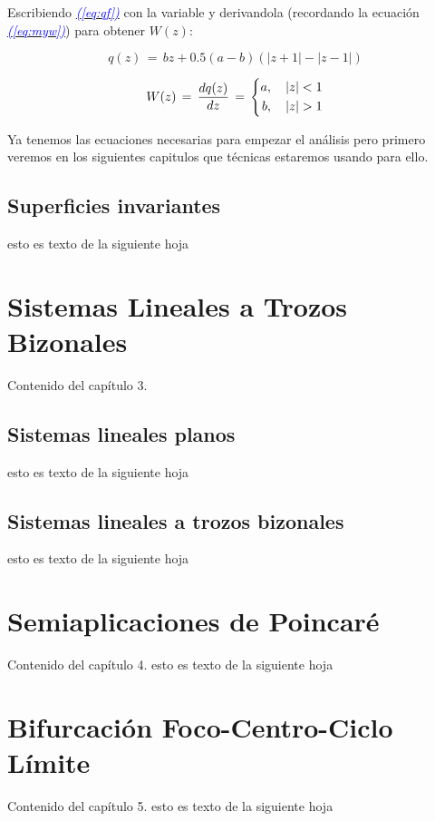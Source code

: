 \documentclass[12pt,a4paper]{report} %
\newcommand{\eref}[1]{\hyperref[#1]{\textcolor{blue}{\textit{(\ref*{#1})}}}}
\begin{document}
    Escribiendo \eref{eq:qf} con la variable  y derivandola (recordando la ecuación \eref{eq:myw}) para obtener $W(z)$:
    
    \begin{equation}
    	q(z)\,=\,bz+0.5(a-b)(|z+1|-|z-1|)
    	\label{eq:qfz}
    \end{equation}
    
    \begin{equation}
    	W(z)\,=\,\frac{dq(z)}{dz}\,=\,
    		\label{eq:wz}
    		\scalebox{1}{$\displaystyle
    			\left\{
    			\begin{aligned}
    				a, \quad   |z| < 1\\
    				b, \quad   |z| > 1
    			\end{aligned}
    			\right.
    			$}
    \end{equation}
    
	Ya tenemos las ecuaciones necesarias para empezar el análisis pero primero veremos en los siguientes capitulos que técnicas estaremos usando para ello.
	\newpage
	\section{Superficies invariantes}
	esto es texto de la siguiente hoja
	
	\chapter{Sistemas Lineales a Trozos Bizonales}
	Contenido del capítulo 3.
	\newpage
	\section{Sistemas lineales planos}
	esto es texto de la siguiente hoja
	\newpage
	\section{Sistemas lineales a trozos bizonales}
	esto es texto de la siguiente hoja
	
	\chapter{Semiaplicaciones de Poincaré}
	Contenido del capítulo 4.
	\newpage
	esto es texto de la siguiente hoja
	
	\chapter{Bifurcación Foco-Centro-Ciclo Límite}
	Contenido del capítulo 5.
	\newpage
	esto es texto de la siguiente hoja
	
\end{document}
